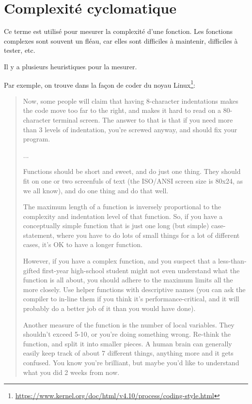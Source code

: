 \section{Complexité cyclomatique}

Ce terme est utilisé pour mesurer la complexité d'une fonction.
Les fonctions complexes sont souvent un fléau, car elles sont difficiles à
maintenir, difficiles à tester, etc.

Il y a plusieurs heuristiques pour la mesurer.

Par exemple, on trouve dans la façon de coder du noyau
Linux\footnote{\url{https://www.kernel.org/doc/html/v4.10/process/coding-style.html}}:

\begin{framed}
\begin{quotation}
Now, some people will claim that having 8-character indentations makes the code move too far to the right, and makes it hard to read on a 80-character terminal screen. The answer to that is that if you need more than 3 levels of indentation, you’re screwed anyway, and should fix your program.

...

Functions should be short and sweet, and do just one thing. They should fit on one or two screenfuls of text (the ISO/ANSI screen size is 80x24, as we all know), and do one thing and do that well.

The maximum length of a function is inversely proportional to the complexity and indentation level of that function. So, if you have a conceptually simple function that is just one long (but simple) case-statement, where you have to do lots of small things for a lot of different cases, it’s OK to have a longer function.

However, if you have a complex function, and you suspect that a less-than-gifted first-year high-school student might not even understand what the function is all about, you should adhere to the maximum limits all the more closely. Use helper functions with descriptive names (you can ask the compiler to in-line them if you think it’s performance-critical, and it will probably do a better job of it than you would have done).

Another measure of the function is the number of local variables. They shouldn’t exceed 5-10, or you’re doing something wrong. Re-think the function, and split it into smaller pieces. A human brain can generally easily keep track of about 7 different things, anything more and it gets confused. You know you’re brilliant, but maybe you’d like to understand what you did 2 weeks from now.
\end{quotation}
\end{framed}

